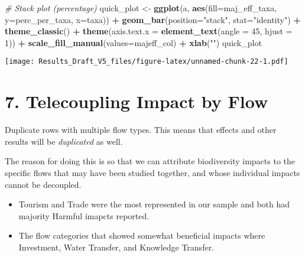 \documentclass[
]{article}
\newenvironment{Shaded}{\begin{snugshade}}{\end{snugshade}}
\newcommand{\CommentTok}[1]{\textcolor[rgb]{0.56,0.35,0.01}{\textit{#1}}}
\newcommand{\DataTypeTok}[1]{\textcolor[rgb]{0.13,0.29,0.53}{#1}}
\newcommand{\DecValTok}[1]{\textcolor[rgb]{0.00,0.00,0.81}{#1}}
\newcommand{\KeywordTok}[1]{\textcolor[rgb]{0.13,0.29,0.53}{\textbf{#1}}}
\newcommand{\NormalTok}[1]{#1}
\newcommand{\OperatorTok}[1]{\textcolor[rgb]{0.81,0.36,0.00}{\textbf{#1}}}
\newcommand{\StringTok}[1]{\textcolor[rgb]{0.31,0.60,0.02}{#1}}
\providecommand{\tightlist}{%
  \setlength{\itemsep}{0pt}\setlength{\parskip}{0pt}}
\begin{document}
\begin{Shaded}
\begin{Highlighting}[]
\CommentTok{# Stack plot (percentage)}
\NormalTok{  quick_plot <-}\StringTok{ }\KeywordTok{ggplot}\NormalTok{(a, }\KeywordTok{aes}\NormalTok{(}\DataTypeTok{fill=}\NormalTok{maj_eff_taxa, }\DataTypeTok{y=}\NormalTok{perc_per_taxa, }\DataTypeTok{x=}\NormalTok{taxa)) }\OperatorTok{+}\StringTok{ }
\StringTok{                }\KeywordTok{geom_bar}\NormalTok{(}\DataTypeTok{position=}\StringTok{"stack"}\NormalTok{, }\DataTypeTok{stat=}\StringTok{"identity"}\NormalTok{) }\OperatorTok{+}
\StringTok{                }\KeywordTok{theme_classic}\NormalTok{() }\OperatorTok{+}
\StringTok{                }\KeywordTok{theme}\NormalTok{(}\DataTypeTok{axis.text.x =} \KeywordTok{element_text}\NormalTok{(}\DataTypeTok{angle =} \DecValTok{45}\NormalTok{, }\DataTypeTok{hjust =} \DecValTok{1}\NormalTok{)) }\OperatorTok{+}
\StringTok{                }\KeywordTok{scale_fill_manual}\NormalTok{(}\DataTypeTok{values=}\NormalTok{majeff_col) }\OperatorTok{+}
\StringTok{                }\KeywordTok{xlab}\NormalTok{(}\StringTok{""}\NormalTok{)}
\NormalTok{quick_plot}
\end{Highlighting}
\end{Shaded}

\texttt{[image: Results\_Draft\_V5\_files/figure-latex/unnamed-chunk-22-1.pdf]}

\hypertarget{telecoupling-impact-by-flow}{%
\section{7. Telecoupling Impact by
Flow}\label{telecoupling-impact-by-flow}}

Duplicate rows with multiple flow types. This means that effects and
other results will be \emph{duplicated} as well.

The reason for doing this is so that we can attribute biodiversity
impacts to the specific flows that may have been studied together, and
whose individual impacts cannot be decoupled.

\begin{itemize}
\tightlist
\item
  Tourism and Trade were the most represented in our sample and both had
  majority Harmful imapcts reported.
\item
  The flow categories that showed somewhat beneficial impacts where
  Investment, Water Transfer, and Knowledge Transfer.
\end{itemize}
\end{document}
